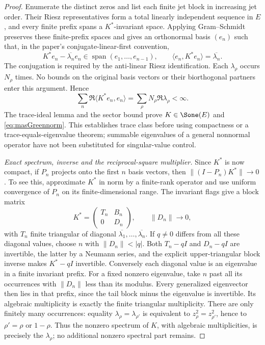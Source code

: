 \begin{proof}
Enumerate the distinct zeros and list each finite jet block in increasing jet order. Their Riesz representatives form a total linearly independent sequence in $E$, and every finite prefix spans a $K^*$-invariant space. Applying Gram--Schmidt preserves these finite-prefix spaces and gives an orthonormal basis $(e_n)$ such that, in the paper's conjugate-linear-first convention,
\[
 K^*e_n-\overline{\lambda_n}e_n\in\operatorname{span}(e_1,\ldots,e_{n-1}),
 \qquad \langle e_n,K^*e_n\rangle=\overline{\lambda_n}.
\]
The conjugation is required by the anti-linear Riesz identification. Each $\lambda_\rho$ occurs $N_\rho$ times. No bounds on the original basis vectors or their biorthogonal partners enter this argument. Hence
\[
 \sum_n\Re\langle K^*e_n,e_n\rangle
 =\sum_\rho N_\rho\Re\lambda_\rho<\infty.
\]
The trace-ideal lemma and the sector bound prove $K\in\Sone(E)$ and
\eqref{eq:masGreennorm}. This establishes trace class before using compactness or a trace-equals-eigenvalue theorem; summable eigenvalues of a general nonnormal operator have not been substituted for singular-value control.

\emph{Exact spectrum, inverse and the reciprocal-square multiplier.}
Since $K^*$ is now compact, if $P_n$ projects onto the first $n$ basis vectors, then
$\|(I-P_n)K^*\|\to0$. To see this, approximate $K^*$ in norm by a finite-rank operator and use uniform convergence of $P_n$ on its finite-dimensional range. The invariant flags give a block matrix
\[
 K^*=\begin{pmatrix}T_n&B_n\\0&D_n\end{pmatrix},
 \qquad \|D_n\|\longrightarrow0,
\]
with $T_n$ finite triangular of diagonal $\overline{\lambda_1},\ldots,\overline{\lambda_n}$.
If $q\ne0$ differs from all these diagonal values, choose $n$ with $\|D_n\|<|q|$. Both $T_n-qI$ and $D_n-qI$ are invertible, the latter by a Neumann series, and the explicit upper-triangular block inverse makes $K^*-qI$ invertible. Conversely each diagonal value is an eigenvalue in a finite invariant prefix. For a fixed nonzero eigenvalue, take $n$ past all its occurrences with $\|D_n\|$ less than its modulus. Every generalized eigenvector then lies in that prefix, since the tail block minus the eigenvalue is invertible. Its algebraic multiplicity is exactly the finite triangular multiplicity. There are only finitely many occurrences: equality $\lambda_\rho=\lambda_{\rho'}$ is equivalent to $z_\rho^2=z_{\rho'}^2$, hence to $\rho'=\rho$ or $1-\rho$. Thus the nonzero spectrum of $K$, with algebraic multiplicities, is precisely the $\lambda_\rho$; no additional nonzero spectral part remains.


\end{proof}
